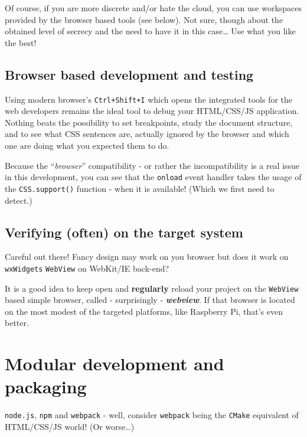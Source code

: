 \documentclass[11pt]{article}
\begin{document}
    Of course, if you are more discrete and/or hate the cloud, you can use
workspaces provided by the browser based tools (see below). Not sure,
though about the obtained level of secrecy and the need to have it in
this case\ldots{} Use what you like the best!

    \hypertarget{browser-based-development-and-testing}{%
\subsection{Browser based development and
testing}\label{browser-based-development-and-testing}}

    Using modern browser's \texttt{Ctrl+Shift+I} which opens the integrated
tools for the web developers remains the ideal tool to debug your
HTML/CSS/JS application. Nothing beats the possibility to set
breakpoints, study the document structure, and to see what CSS sentences
are, actually ignored by the browser and which one are doing what you
expected them to do.

    Because the ``\emph{browser}'' compatibility - or rather the
incompatibility is a real issue in this development, you can see that
the \texttt{onload} event handler takes the usage of the
\texttt{CSS.support()} function - when it is available! (Which we first
need to detect.)

    \hypertarget{verifying-often-on-the-target-system}{%
\subsection{Verifying (often) on the target
system}\label{verifying-often-on-the-target-system}}

    Careful out there! Fancy design may work on you browser but does it work
on \texttt{wxWidgets} \texttt{WebView} on WebKit/IE back-end?

    It is a good idea to keep open and \textbf{regularly} reload your
project on the \texttt{WebView} based simple browser, called -
surprisingly - \textbf{\emph{webview}}. If that browser is located on
the most modest of the targeted platforms, like Raspberry Pi, that's
even better.

    \hypertarget{modular-development-and-packaging}{%
\section{Modular development and
packaging}\label{modular-development-and-packaging}}

    \texttt{node.js}, \texttt{npm} and \texttt{webpack} - well, consider
\texttt{webpack} being the \texttt{CMake} equivalent of HTML/CSS/JS
world! (Or worse\ldots)
\end{document}

